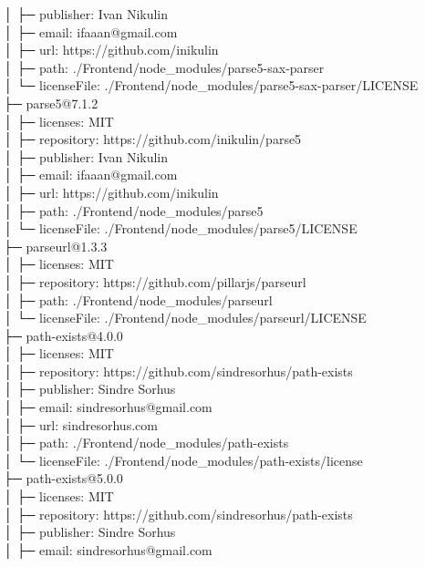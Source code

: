 \documentclass[
    paper=a4,
    twoside=false,
    parskip=half,
    listof=entryprefix,
    listof=totoc,
    index=totoc,
    bibliography=totoc,
    headsepline,
]{scrbook}
\begin{document}
    │  ├─ publisher: Ivan Nikulin\\
    │  ├─ email: ifaaan@gmail.com\\
    │  ├─ url: https://github.com/inikulin\\
    │  ├─ path: ./Frontend/node\_modules/parse5-sax-parser\\
    │  └─ licenseFile: ./Frontend/node\_modules/parse5-sax-parser/LICENSE\\
    ├─ parse5@7.1.2\\
    │  ├─ licenses: MIT\\
    │  ├─ repository: https://github.com/inikulin/parse5\\
    │  ├─ publisher: Ivan Nikulin\\
    │  ├─ email: ifaaan@gmail.com\\
    │  ├─ url: https://github.com/inikulin\\
    │  ├─ path: ./Frontend/node\_modules/parse5\\
    │  └─ licenseFile: ./Frontend/node\_modules/parse5/LICENSE\\
    ├─ parseurl@1.3.3\\
    │  ├─ licenses: MIT\\
    │  ├─ repository: https://github.com/pillarjs/parseurl\\
    │  ├─ path: ./Frontend/node\_modules/parseurl\\
    │  └─ licenseFile: ./Frontend/node\_modules/parseurl/LICENSE\\
    ├─ path-exists@4.0.0\\
    │  ├─ licenses: MIT\\
    │  ├─ repository: https://github.com/sindresorhus/path-exists\\
    │  ├─ publisher: Sindre Sorhus\\
    │  ├─ email: sindresorhus@gmail.com\\
    │  ├─ url: sindresorhus.com\\
    │  ├─ path: ./Frontend/node\_modules/path-exists\\
    │  └─ licenseFile: ./Frontend/node\_modules/path-exists/license\\
    ├─ path-exists@5.0.0\\
    │  ├─ licenses: MIT\\
    │  ├─ repository: https://github.com/sindresorhus/path-exists\\
    │  ├─ publisher: Sindre Sorhus\\
    │  ├─ email: sindresorhus@gmail.com\\
\end{document}
